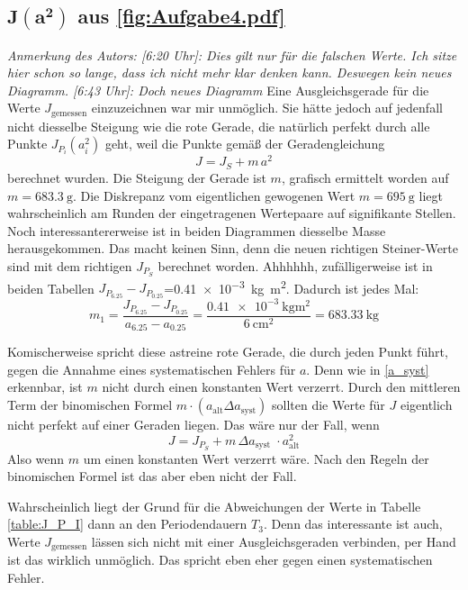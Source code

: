 \subsection[\texorpdfstring{\(J(a^2)\) aus \cref{fig:Aufgabe4.pdf}}{Trägheitsmoment aus Aufgabe 4}]{\(\boldsymbol{J(a^2)}\) aus \cref{fig:Aufgabe4.pdf}}
\emph{Anmerkung des Autors: [6:20 Uhr]: Dies gilt nur für die falschen Werte. Ich sitze hier schon so lange, dass ich nicht mehr klar denken kann. Deswegen kein neues Diagramm. [6:43 Uhr]: Doch neues Diagramm}
Eine Ausgleichsgerade für die Werte \(J_{\text{gemessen}}\) einzuzeichnen war mir unmöglich. Sie hätte jedoch auf jedenfall nicht diesselbe Steigung wie die rote Gerade, die natürlich perfekt durch alle Punkte \(J_{P_i}(a_i^2)\) geht, weil die Punkte gemäß der Geradengleichung
\[J=J_S+m\,a^2\] berechnet wurden. Die Steigung der Gerade ist \(m\), grafisch ermittelt worden auf \(m=\qty{683.3}{\gram}\). Die Diskrepanz vom eigentlichen gewogenen Wert \(m=\qty{695}{\gram}\) liegt wahrscheinlich am Runden der eingetragenen Wertepaare auf signifikante Stellen.
Noch interessantererweise ist in beiden Diagrammen diesselbe Masse herausgekommen. Das macht keinen Sinn, denn die neuen richtigen Steiner-Werte sind mit dem richtigen \(J_{P_S}\) berechnet worden. Ahhhhhh, zufälligerweise ist in beiden Tabellen \(J_{P_{6.25}}-J_{P_{0.25}}\)=\qty{0.41e-3}{\kg\meter\squared}. Dadurch ist jedes Mal:
\begin{equation}
  m_1=\frac{J_{P_{6.25}}-J_{P_{0.25}}}{a_{6.25}-a_{0.25}}=\frac{\qty{0.41e-3}{\kg\meter\squared}}{\qty{6}{\cm\squared}}=\qty{683.33}{\kg}
\end{equation}

Komischerweise spricht diese astreine rote Gerade, die durch jeden Punkt führt, gegen die Annahme eines systematischen Fehlers für \(a\). Denn wie in \cref{a_syst} erkennbar, ist \(m\) nicht durch einen konstanten Wert verzerrt. Durch den mittleren Term der binomischen Formel \(m\cdot(a_{\text{alt}}\Delta a_{\text{syst}})\) sollten die Werte für \(J\) eigentlich nicht perfekt auf einer Geraden liegen. Das wäre nur der Fall, wenn
\[J=J_{P_S}+m\,\Delta a_{\text{syst}}\;\cdot a_{\text{alt}}^2\] 
Also wenn \(m\) um einen konstanten Wert verzerrt wäre. Nach den Regeln der binomischen Formel ist das aber eben nicht der Fall.
 
Wahrscheinlich liegt der Grund für die Abweichungen der Werte in Tabelle \cref{table:J_P_I} dann an den Periodendauern \(T_3\). Denn das interessante ist auch, Werte \(J_{\text{gemessen}}\) lässen sich nicht mit einer Ausgleichsgeraden verbinden, per Hand ist das wirklich unmöglich. Das spricht eben eher gegen einen systematischen Fehler. 

